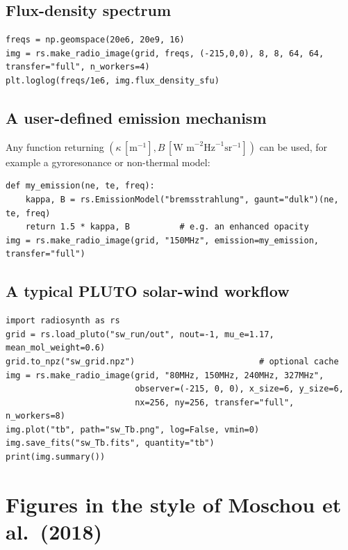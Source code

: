 \section{Flux-density spectrum}
\begin{lstlisting}[style=pyex]
freqs = np.geomspace(20e6, 20e9, 16)
img = rs.make_radio_image(grid, freqs, (-215,0,0), 8, 8, 64, 64, transfer="full", n_workers=4)
plt.loglog(freqs/1e6, img.flux_density_sfu)
\end{lstlisting}

\section{A user-defined emission mechanism}
Any function returning $(\kappa\,[\text{m}^{-1}], B\,[\text{W m}^{-2}\text{Hz}^{-1}\text{sr}^{-1}])$
can be used, for example a gyroresonance or non-thermal model:
\begin{lstlisting}[style=pyex]
def my_emission(ne, te, freq):
    kappa, B = rs.EmissionModel("bremsstrahlung", gaunt="dulk")(ne, te, freq)
    return 1.5 * kappa, B          # e.g. an enhanced opacity
img = rs.make_radio_image(grid, "150MHz", emission=my_emission, transfer="full")
\end{lstlisting}

\section{A typical PLUTO solar-wind workflow}
\begin{lstlisting}[style=pyex]
import radiosynth as rs
grid = rs.load_pluto("sw_run/out", nout=-1, mu_e=1.17, mean_mol_weight=0.6)
grid.to_npz("sw_grid.npz")                         # optional cache
img = rs.make_radio_image(grid, "80MHz, 150MHz, 240MHz, 327MHz",
                          observer=(-215, 0, 0), x_size=6, y_size=6,
                          nx=256, ny=256, transfer="full", n_workers=8)
img.plot("tb", path="sw_Tb.png", log=False, vmin=0)
img.save_fits("sw_Tb.fits", quantity="tb")
print(img.summary())
\end{lstlisting}

\chapter{Figures in the style of Moschou et al.\ (2018)}\label{chap:figs}

